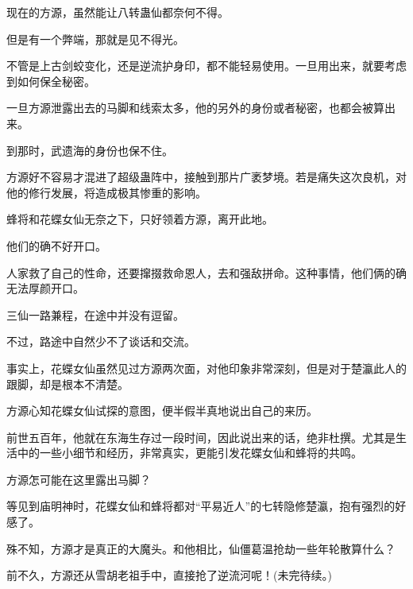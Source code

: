 \begin{this_body}
现在的方源，虽然能让八转蛊仙都奈何不得。

但是有一个弊端，那就是见不得光。

不管是上古剑蛟变化，还是逆流护身印，都不能轻易使用。一旦用出来，就要考虑到如何保全秘密。

一旦方源泄露出去的马脚和线索太多，他的另外的身份或者秘密，也都会被算出来。

到那时，武遗海的身份也保不住。

方源好不容易才混进了超级蛊阵中，接触到那片广袤梦境。若是痛失这次良机，对他的修行发展，将造成极其惨重的影响。

蜂将和花蝶女仙无奈之下，只好领着方源，离开此地。

他们的确不好开口。

人家救了自己的性命，还要撺掇救命恩人，去和强敌拼命。这种事情，他们俩的确无法厚颜开口。

三仙一路兼程，在途中并没有逗留。

不过，路途中自然少不了谈话和交流。

事实上，花蝶女仙虽然见过方源两次面，对他印象非常深刻，但是对于楚瀛此人的跟脚，却是根本不清楚。

方源心知花蝶女仙试探的意图，便半假半真地说出自己的来历。

前世五百年，他就在东海生存过一段时间，因此说出来的话，绝非杜撰。尤其是生活中的一些小细节和经历，非常真实，更能引发花蝶女仙和蜂将的共鸣。

方源怎可能在这里露出马脚？

等见到庙明神时，花蝶女仙和蜂将都对“平易近人”的七转隐修楚瀛，抱有强烈的好感了。

殊不知，方源才是真正的大魔头。和他相比，仙僵葛温抢劫一些年轮散算什么？

前不久，方源还从雪胡老祖手中，直接抢了逆流河呢！(未完待续。)

\end{this_body}

